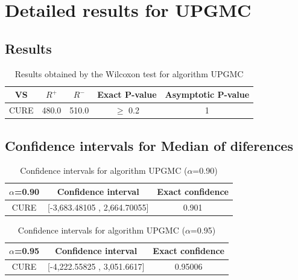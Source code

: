 \documentclass[a4paper,10pt]{article}
\begin{document}
 \clearpage 


\section{Detailed results for UPGMC}


\subsection{Results}

\begin{table}[!htp]
\centering\small
\begin{tabular}{
|c|c|c|c|c|}
\hline
 VS & $R^{+}$ & $R^{-}$ & Exact P-value & Asymptotic P-value \\ \hline 
CURE & 480.0 & 510.0 & $\geq$ 0.2 & 1\\ \hline 

\end{tabular}
\caption{Results obtained by the Wilcoxon test for algorithm UPGMC}
\end{table}

\subsection{Confidence intervals for Median of diferences}

\begin{table}[!htp]
\centering\small
\begin{tabular}{
|c|c|c|}
\hline
 $\alpha$=0.90 & Confidence interval & Exact confidence \\ \hline 
CURE & [-3,683.48105 , 2,664.70055] & 0.901\\ \hline 

\end{tabular}
\caption{Confidence intervals for algorithm UPGMC ($\alpha$=0.90)}
\end{table}
\begin{table}[!htp]
\centering\small
\begin{tabular}{
|c|c|c|}
\hline
 $\alpha$=0.95 & Confidence interval & Exact confidence \\ \hline 
CURE & [-4,222.55825 , 3,051.6617] & 0.95006\\ \hline 

\end{tabular}
\caption{Confidence intervals for algorithm UPGMC ($\alpha$=0.95)}
\end{table}

 \clearpage 
\end{document}
